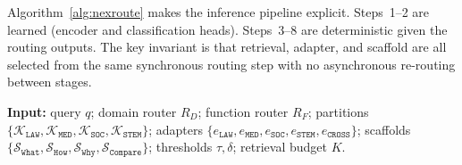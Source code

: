 \documentclass[a4paper,fleql,doubleblind]{cas-sc}
\begin{document}
Algorithm~\ref{alg:nexroute} makes the inference pipeline explicit.
Steps~1--2 are learned (encoder and classification heads).
Steps~3--8 are deterministic given the routing outputs.
The key invariant is that retrieval, adapter, and scaffold are all selected
from the same synchronous routing step with no asynchronous re-routing between stages.

\vspace{4pt}
\begin{tcolorbox}[colback=gray!4, colframe=gray!35, arc=3pt, boxrule=0.6pt,
  left=10pt, right=10pt, top=8pt, bottom=8pt,
  title={\textbf{Algorithm 1: NexRoute Inference}}, fonttitle=\bfseries]
\label{alg:nexroute}
\textbf{Input:} query $q$; domain router $R_D$; function router $R_F$;
partitions $\{\mathcal{K}_\texttt{LAW},\mathcal{K}_\texttt{MED},
\mathcal{K}_\texttt{SOC},\mathcal{K}_\texttt{STEM}\}$;
adapters $\{e_\texttt{LAW},e_\texttt{MED},e_\texttt{SOC},e_\texttt{STEM},
e_\texttt{CROSS}\}$;
scaffolds $\{\mathcal{S}_\texttt{What},\mathcal{S}_\texttt{How},
\mathcal{S}_\texttt{Why},\mathcal{S}_\texttt{Compare}\}$;
thresholds $\tau, \delta$; retrieval budget $K$.


\end{tcolorbox}
\end{document}

